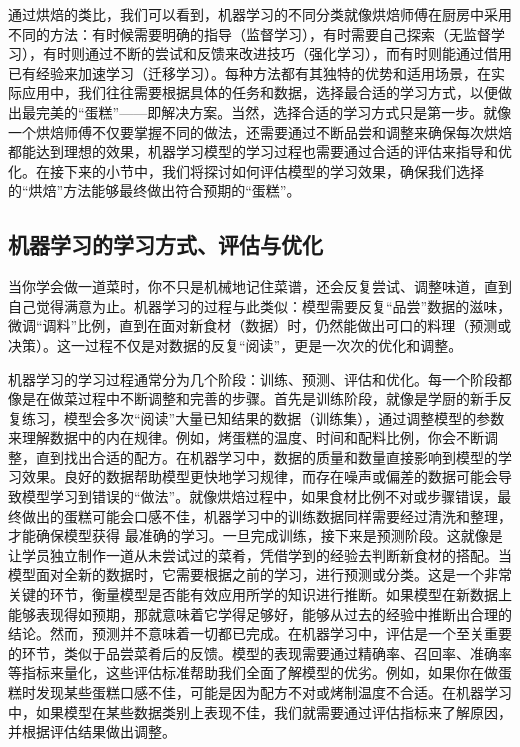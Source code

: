 通过烘焙的类比，我们可以看到，机器学习的不同分类就像烘焙师傅在厨房中采用不同的方法：有时候需要明确的指导（监督学习），有时需要自己探索（无监督学习），有时则通过不断的尝试和反馈来改进技巧（强化学习），而有时则能通过借用已有经验来加速学习（迁移学习）。每种方法都有其独特的优势和适用场景，在实际应用中，我们往往需要根据具体的任务和数据，选择最合适的学习方式，以便做出最完美的“蛋糕”——即解决方案。当然，选择合适的学习方式只是第一步。就像一个烘焙师傅不仅要掌握不同的做法，还需要通过不断品尝和调整来确保每次烘焙都能达到理想的效果，机器学习模型的学习过程也需要通过合适的评估来指导和优化。在接下来的小节中，我们将探讨如何评估模型的学习效果，确保我们选择的“烘焙”方法能够最终做出符合预期的“蛋糕”。

\subsection{机器学习的学习方式、评估与优化}

当你学会做一道菜时，你不只是机械地记住菜谱，还会反复尝试、调整味道，直到自己觉得满意为止。机器学习的过程与此类似：模型需要反复“品尝”数据的滋味，微调“调料”比例，直到在面对新食材（数据）时，仍然能做出可口的料理（预测或决策）。这一过程不仅是对数据的反复“阅读”，更是一次次的优化和调整。

机器学习的学习过程通常分为几个阶段：训练、预测、评估和优化。每一个阶段都像是在做菜过程中不断调整和完善的步骤。首先是训练阶段，就像是学厨的新手反复练习，模型会多次“阅读”大量已知结果的数据（训练集），通过调整模型的参数来理解数据中的内在规律。例如，烤蛋糕的温度、时间和配料比例，你会不断调整，直到找出合适的配方。在机器学习中，数据的质量和数量直接影响到模型的学习效果。良好的数据帮助模型更快地学习规律，而存在噪声或偏差的数据可能会导致模型学习到错误的“做法”。就像烘焙过程中，如果食材比例不对或步骤错误，最终做出的蛋糕可能会口感不佳，机器学习中的训练数据同样需要经过清洗和整理，才能确保模型获得 最准确的学习。一旦完成训练，接下来是预测阶段。这就像是让学员独立制作一道从未尝试过的菜肴，凭借学到的经验去判断新食材的搭配。当模型面对全新的数据时，它需要根据之前的学习，进行预测或分类。这是一个非常关键的环节，衡量模型是否能有效应用所学的知识进行推断。如果模型在新数据上能够表现得如预期，那就意味着它学得足够好，能够从过去的经验中推断出合理的结论。然而，预测并不意味着一切都已完成。在机器学习中，评估是一个至关重要的环节，类似于品尝菜肴后的反馈。模型的表现需要通过精确率、召回率、准确率等指标来量化，这些评估标准帮助我们全面了解模型的优劣。例如，如果你在做蛋糕时发现某些蛋糕口感不佳，可能是因为配方不对或烤制温度不合适。在机器学习中，如果模型在某些数据类别上表现不佳，我们就需要通过评估指标来了解原因，并根据评估结果做出调整。

